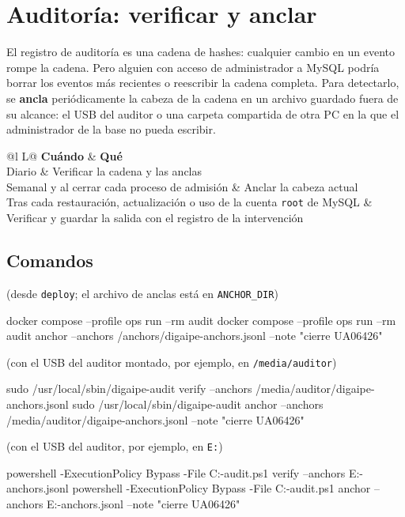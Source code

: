 \chapter{Auditoría: verificar y anclar}
\label{cap:auditoria}

El registro de auditoría es una cadena de hashes: cualquier cambio en un evento rompe la cadena.
Pero alguien con acceso de administrador a MySQL podría borrar los eventos más recientes o
reescribir la cadena completa. Para detectarlo, se \textbf{ancla} periódicamente la cabeza de la
cadena en un archivo guardado fuera de su alcance: el USB del auditor o una carpeta compartida
de otra PC en la que el administrador de la base no pueda escribir.

\begin{xltabular}{\linewidth}{@{}l L@{}}
	\toprule
	\textbf{Cuándo} & \textbf{Qué} \\
	\midrule
	\endhead
	Diario & Verificar la cadena y las anclas \\
	Semanal y al cerrar cada proceso de admisión & Anclar la cabeza actual \\
	Tras cada restauración, actualización o uso de la cuenta \texttt{root} de MySQL & Verificar
	y guardar la salida con el registro de la intervención \\
	\bottomrule
\end{xltabular}

\section{Comandos}

 (desde \texttt{deploy}; el archivo de anclas está en \texttt{ANCHOR\_DIR})
\begin{codigo}
docker compose --profile ops run --rm audit
docker compose --profile ops run --rm audit anchor --anchors /anchors/digaipe-anchors.jsonl --note "cierre UA06426"
\end{codigo}

 (con el USB del auditor montado, por ejemplo, en \texttt{/media/auditor})
\begin{codigo}
sudo /usr/local/sbin/digaipe-audit verify --anchors /media/auditor/digaipe-anchors.jsonl
sudo /usr/local/sbin/digaipe-audit anchor --anchors /media/auditor/digaipe-anchors.jsonl --note "cierre UA06426"
\end{codigo}

 (con el USB del auditor, por ejemplo, en \texttt{E:})
\begin{codigo}
powershell -ExecutionPolicy Bypass -File C:\digaipe\bin\digaipe-audit.ps1 verify --anchors E:\digaipe-anchors.jsonl
powershell -ExecutionPolicy Bypass -File C:\digaipe\bin\digaipe-audit.ps1 anchor --anchors E:\digaipe-anchors.jsonl --note "cierre UA06426"
\end{codigo}

